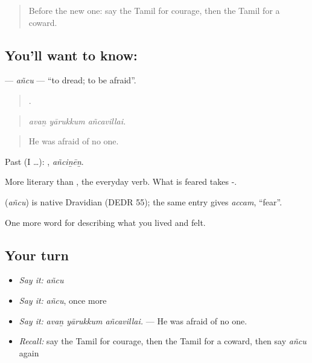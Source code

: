 \label{lesson:TA-C466-ancu}



\begin{quote}
Before the new one: say the Tamil for courage, then the Tamil for a coward.
\end{quote}

\subsection*{You'll want to know: }
\textbf{} — \emph{añcu} — \textquotedblleft{}to dread; to be afraid\textquotedblright{}.

\begin{quote}
  .
\end{quote}

\begin{quote}
\emph{avaṉ yārukkum añcavillai.}
\end{quote}

\begin{quote}
He was afraid of no one.
\end{quote}

Past (I …): , \emph{añciṉēṉ}.

More literary than , the everyday verb. What is feared takes -.

\begin{cousinweb}
\textbf{} (\emph{añcu}) is native Dravidian (DEDR 55); the same entry gives  \emph{accam}, \textquotedblleft{}fear\textquotedblright{}.
\end{cousinweb}

\begin{grammarlens}[title={What you've built}]
One more word for describing what you lived and felt.
\end{grammarlens}

\subsection*{Your turn}
\begin{itemize}
\raggedright
  \item \emph{Say it:} \emph{añcu}
  \item \emph{Say it:} \emph{añcu}, once more
  \item \emph{Say it:} \emph{avaṉ yārukkum añcavillai.} — He was afraid of no one.
  \item \emph{Recall:} say the Tamil for courage, then the Tamil for a coward, then say \emph{añcu} again
\end{itemize}

